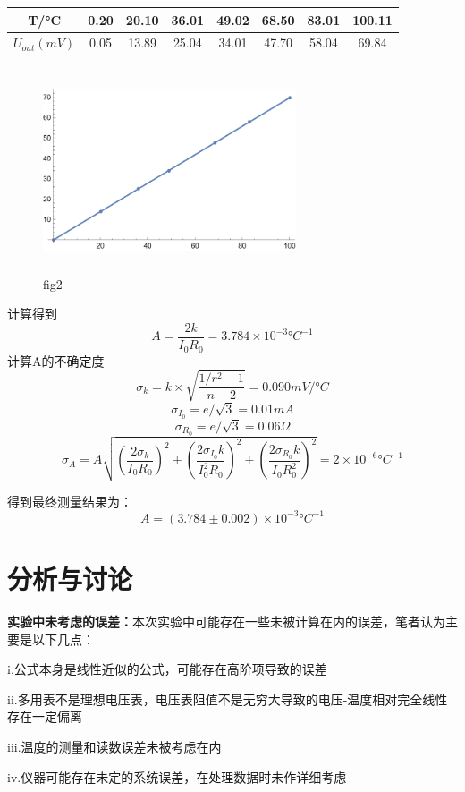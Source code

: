 \documentclass[a4paper, 10pt]{article}
\begin{document}
\begin{center}
  \begin{tabular}{|c|c|c|c|c|c|c|c|}
    \hline
    T/°C&0.20&20.10 & 36.01 & 49.02&68.50&83.01&100.11\\
    \hline
    $U_{out}(mV)$ &0.05&13.89&25.04&34.01&47.70&58.04&69.84\\
    \hline
    
    

  \end{tabular}
  \begin{figure}[ht]
    \centering 
    \includegraphics[height=6.0cm,width=7.5cm]{p3.png}
    
    \caption{fig2}
    \label{4}
    
    \end{figure}
  
\end{center}

\noindent 计算得到
$$A=\frac{2k}{I_0R_0}=3.784\times 10^{-3}°C^{-1}$$
计算A的不确定度
$$\sigma_k=k\times \sqrt{\frac{1/r^2-1}{n-2}}=0.090mV/°C$$
$$\sigma_{I_0}=e/\sqrt{3}=0.01mA$$
$$\sigma_{R_0}=e/\sqrt{3}=0.06\Omega$$
$$\sigma_A=A\sqrt{(\frac{2\sigma_k}{I_0R_0})^2+(\frac{2\sigma_{I_0}k}{I_0^2R_0})^2+(\frac{2\sigma_{R_0}k}{I_0R_0^2})^2}=2\times 10^{-6}°C^{-1}$$

\noindent 得到最终测量结果为：
$$A=(3.784\pm0.002)\times 10^{-3}°C^{-1}$$

\section{分析与讨论}
\noindent \textbf{实验中未考虑的误差：}本次实验中可能存在一些未被计算在内的误差，笔者认为主要是以下几点：

\noindent i.公式本身是线性近似的公式，可能存在高阶项导致的误差

\noindent ii.多用表不是理想电压表，电压表阻值不是无穷大导致的电压-温度相对完全线性存在一定偏离

\noindent iii.温度的测量和读数误差未被考虑在内

\noindent iv.仪器可能存在未定的系统误差，在处理数据时未作详细考虑
\end{document}
